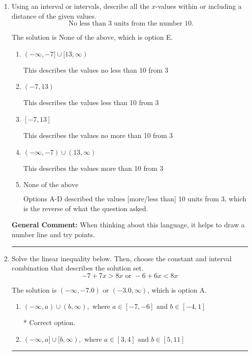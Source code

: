 \documentclass{extbook}[14pt]
\newcommand{\litem}[1]{\item #1

\rule{\textwidth}{0.4pt}}
\begin{document}
\begin{enumerate}
{\begin{enumerate}[label=\Alph*.]
* $[12.381, \infty)$, which is the correct option.
\item \( \text{None of the above}. \)

You may have chosen this if you thought the inequality did not match the ends of the intervals.
\end{enumerate}

\textbf{General Comment:} Remember that less/greater than or equal to includes the endpoint, while less/greater do not. Also, remember that you need to flip the inequality when you multiply or divide by a negative.
}
\litem{
Using an interval or intervals, describe all the $x$-values within or including a distance of the given values.
\[ \text{ No less than } 3 \text{ units from the number } 10. \]

The solution is \( \text{None of the above} \), which is option E.\begin{enumerate}[label=\Alph*.]
\item \( (-\infty, -7] \cup [13, \infty) \)

This describes the values no less than 10 from 3
\item \( (-7, 13) \)

This describes the values less than 10 from 3
\item \( [-7, 13] \)

This describes the values no more than 10 from 3
\item \( (-\infty, -7) \cup (13, \infty) \)

This describes the values more than 10 from 3
\item \( \text{None of the above} \)

Options A-D described the values [more/less than] 10 units from 3, which is the reverse of what the question asked.
\end{enumerate}

\textbf{General Comment:} When thinking about this language, it helps to draw a number line and try points.
}
\litem{
Solve the linear inequality below. Then, choose the constant and interval combination that describes the solution set.
\[ -7 + 7 x > 8 x \text{ or } -6 + 6 x < 8 x \]

The solution is \( (-\infty, -7.0) \text{ or } (-3.0, \infty) \), which is option A.\begin{enumerate}[label=\Alph*.]
\item \( (-\infty, a) \cup (b, \infty), \text{ where } a \in [-7, -6] \text{ and } b \in [-4, 1] \)

 * Correct option.
\item \( (-\infty, a] \cup [b, \infty), \text{ where } a \in [3, 4] \text{ and } b \in [5, 11] \)


\end{enumerate}}
\end{enumerate}
\end{document}
